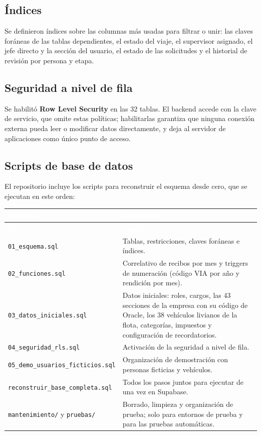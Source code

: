 \documentclass[11pt,letterpaper]{article}
\newcommand{\cabecera}{\rowcolor{maxamPrimario}}
\newcommand{\tth}[1]{\textcolor{white}{\textbf{#1}}}
\newcommand{\code}[1]{\nolinkurl{#1}}
\begin{document}
\subsection{Índices}
Se definieron índices sobre las columnas más usadas para filtrar o unir: las claves foráneas de las tablas dependientes, el estado del viaje, el supervisor asignado, el jefe directo y la sección del usuario, el estado de las solicitudes y el historial de revisión por persona y etapa.

\subsection{Seguridad a nivel de fila}
Se habilitó \textbf{Row Level Security} en las 32 tablas. El backend accede con la clave de servicio, que omite estas políticas; habilitarlas garantiza que ninguna conexión externa pueda leer o modificar datos directamente, y deja al servidor de aplicaciones como único punto de acceso.

\subsection{Scripts de base de datos}
El repositorio incluye los scripts para reconstruir el esquema desde cero, que se ejecutan en este orden:

\begin{xltabular}{\textwidth}{L{5.4cm} Y}
\cabecera \tth{Archivo} & \tth{Contenido} \\
\endfirsthead
\cabecera \tth{Archivo} & \tth{Contenido} \\
\endhead
{} \code{01_esquema.sql} & Tablas, restricciones, claves foráneas e índices. \\
\code{02_funciones.sql} & Correlativo de recibos por mes y triggers de numeración (código VIA por año y rendición por mes). \\
 \code{03_datos_iniciales.sql} & Datos iniciales: roles, cargos, las 43 secciones de la empresa con su código de Oracle, los 38 vehículos livianos de la flota, categorías, impuestos y configuración de recordatorios. \\
\code{04_seguridad_rls.sql} & Activación de la seguridad a nivel de fila. \\
 \code{05_demo_usuarios_ficticios.sql} & Organización de demostración con personas ficticias y vehículos. \\
\code{reconstruir_base_completa.sql} & Todos los pasos juntos para ejecutar de una vez en Supabase. \\
 \code{mantenimiento/} y \code{pruebas/} & Borrado, limpieza y organización de prueba; solo para entornos de prueba y para las pruebas automáticas. \\
\end{xltabular}
\end{document}

